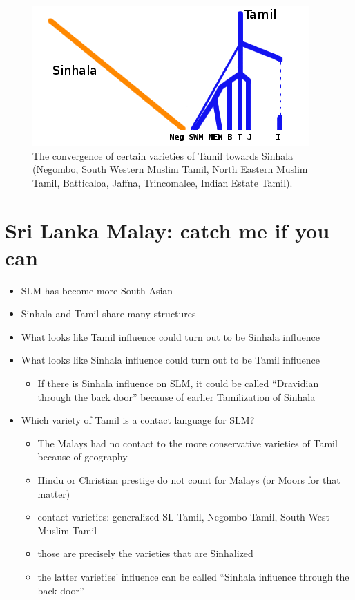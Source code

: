 \documentclass[a4paper,utf8]{article}
\begin{document}
\begin{figure}[h]
 \centering
 \includegraphics[width=\textwidth]{./Tamiltree.png}
 \caption{The convergence of certain varieties of Tamil towards Sinhala (Negombo, South Western Muslim Tamil, North Eastern Muslim Tamil, Batticaloa, Jaffna, Trincomalee,  Indian Estate Tamil).}
\end{figure}

\newpage
\section{Sri Lanka Malay: catch me if you can}

 
    \begin{itemize}
 \item SLM has become more South Asian
 \item Sinhala and Tamil share many structures \citep{Smith2003timing}
 \item What looks like Tamil influence could turn out to be Sinhala influence
 \item What looks like Sinhala influence could turn out to be Tamil influence
    \begin{itemize}
    \item If there is Sinhala influence on SLM, it could be called ``Dravidian through the back door'' because of earlier Tamilization of Sinhala
    \end{itemize}
\end{itemize} 
 
\begin{itemize}
 \item Which variety of Tamil is a contact language for SLM?
  \begin{itemize}
 \item The Malays had no contact to the more conservative varieties of Tamil because of geography
 \item Hindu or Christian prestige do not count for Malays (or Moors for that matter)
 \item contact varieties: generalized SL Tamil, Negombo Tamil, South West Muslim Tamil
 \item those are precisely the varieties that are Sinhalized
 \item the latter varieties' influence can be called ``Sinhala influence through the back door''
 \end{itemize}
\end{itemize} 
\end{document}
